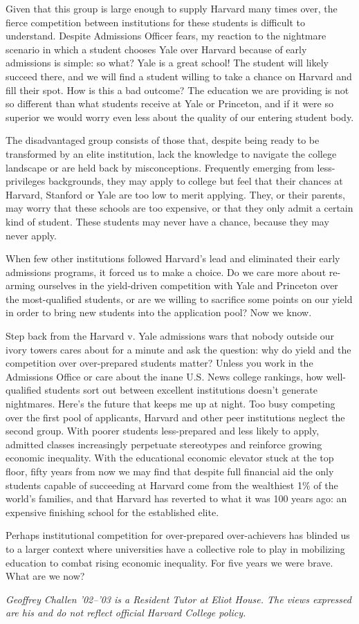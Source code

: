 Given that this group is large enough to supply Harvard many times over, the
fierce competition between institutions for these students is difficult to
understand. Despite Admissions Officer fears, my reaction to the nightmare
scenario in which a student chooses Yale over Harvard because of early
admissions is simple: so what? Yale is a great school! The student will
likely succeed there, and we will find a student willing to take a chance on
Harvard and fill their spot. How is this a bad outcome? The education we are
providing is not so different than what students receive at Yale or
Princeton, and if it were so superior we would worry even less about the
quality of our entering student body.

The disadvantaged group consists of those that, despite being ready to be
transformed by an elite institution, lack the knowledge to navigate the
college landscape or are held back by misconceptions. Frequently emerging
from less-privileges backgrounds, they may apply to college but feel that
their chances at Harvard, Stanford or Yale are too low to merit applying.
They, or their parents, may worry that these schools are too expensive, or
that they only admit a certain kind of student. These students may never have
a chance, because they may never apply.

When few other institutions followed Harvard's lead and eliminated their
early admissions programs, it forced us to make a choice. Do we care more
about re-arming ourselves in the yield-driven competition with Yale and
Princeton over the most-qualified students, or are we willing to sacrifice
some points on our yield in order to bring new students into the application
pool? Now we know.

Step back from the Harvard v. Yale admissions wars that nobody outside our
ivory towers cares about for a minute and ask the question: why do yield and
the competition over over-prepared students matter? Unless you work in the
Admissions Office or care about the inane U.S. News college rankings, how
well-qualified students sort out between excellent institutions doesn't
generate nightmares. Here's the future that keeps me up at night. Too busy
competing over the first pool of applicants, Harvard and other peer
institutions neglect the second group. With poorer students less-prepared and
less likely to apply, admitted classes increasingly perpetuate stereotypes
and reinforce growing economic inequality. With the educational economic
elevator stuck at the top floor, fifty years from now we may find that
despite full financial aid the only students capable of succeeding at Harvard
come from the wealthiest 1\% of the world's families, and that Harvard has
reverted to what it was 100 years ago: an expensive finishing school for the
established elite.

Perhaps institutional competition for over-prepared over-achievers has
blinded us to a larger context where universities have a collective role to
play in mobilizing education to combat rising economic inequality. For five
years we were brave. What are we now?


\textit{Geoffrey Challen '02--'03 is a Resident Tutor at Eliot House. The
views expressed are his and do not reflect official Harvard College policy.}
